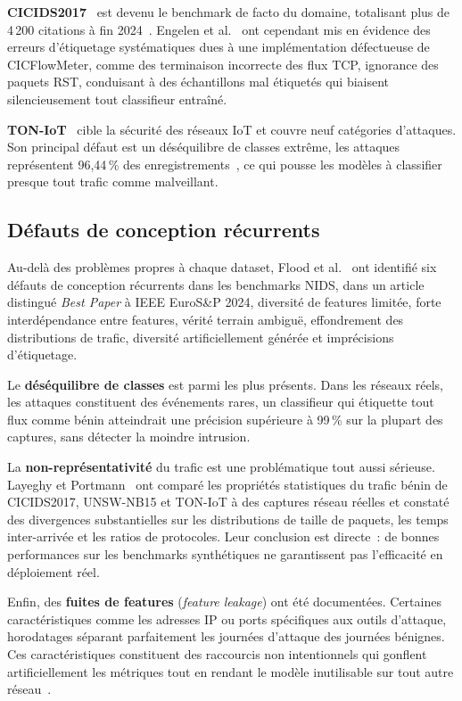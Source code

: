 \documentclass[12pt, a4paper]{report}
\begin{document}
\textbf{CICIDS2017}~\cite{sharafaldin2018} est devenu le benchmark de facto du domaine, totalisant
plus de 4\,200 citations à fin 2024~\cite{concap2026}. Engelen et al.~\cite{engelen2021} ont
cependant mis en évidence des erreurs d'étiquetage systématiques dues à une implémentation
défectueuse de CICFlowMeter, comme des terminaison incorrecte des flux TCP, ignorance des paquets RST,
conduisant à des échantillons mal étiquetés qui biaisent silencieusement tout classifieur entraîné.
 
\textbf{TON-IoT}~\cite{alsaedi2020} cible la sécurité des réseaux IoT et couvre neuf catégories
d'attaques. Son principal défaut est un déséquilibre de classes extrême, les attaques représentent
96,44\,\% des enregistrements~\cite{dinh2026}, ce qui pousse les modèles à classifier presque tout
trafic comme malveillant.
 
\subsection{Défauts de conception récurrents}
 
Au-delà des problèmes propres à chaque dataset, Flood et al.~\cite{flood2024} ont identifié
six défauts de conception récurrents dans les benchmarks NIDS, dans un article distingué
\textit{Best Paper} à IEEE EuroS\&P 2024, diversité de features limitée, forte interdépendance
entre features, vérité terrain ambiguë, effondrement des distributions de trafic, diversité
artificiellement générée et imprécisions d'étiquetage.
 
Le \textbf{déséquilibre de classes} est parmi les plus présents. Dans les réseaux réels, les
attaques constituent des événements rares, un classifieur qui étiquette tout flux comme bénin
atteindrait une précision supérieure à 99\,\% sur la plupart des captures, sans détecter la
moindre intrusion.
 
La \textbf{non-représentativité} du trafic est une problématique tout aussi sérieuse. Layeghy
et Portmann~\cite{layeghy2022} ont comparé les propriétés statistiques du trafic bénin de
CICIDS2017, UNSW-NB15 et TON-IoT à des captures réseau réelles et constaté des divergences
substantielles sur les distributions de taille de paquets, les temps inter-arrivée et les ratios
de protocoles. Leur conclusion est directe~: de bonnes performances sur les benchmarks synthétiques
ne garantissent pas l'efficacité en déploiement réel.
 
Enfin, des \textbf{fuites de features} (\textit{feature leakage}) ont été documentées.
Certaines caractéristiques comme les adresses IP ou ports spécifiques aux outils d'attaque,
horodatages séparant parfaitement les journées d'attaque des journées bénignes. Ces caractéristiques constituent des raccourcis non intentionnels qui gonflent artificiellement les métriques tout en rendant
le modèle inutilisable sur tout autre réseau~\cite{flood2024}.
 
\end{document}

